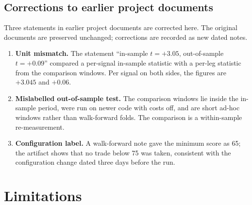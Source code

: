 \documentclass[11pt,a4paper]{article}
\begin{document}
\subsection{Corrections to earlier project documents}
\label{sec:corrections}
Three statements in earlier project documents are corrected here. The original documents are
preserved unchanged; corrections are recorded as new dated notes.
\begin{enumerate}
\item \textbf{Unit mismatch.} The statement ``in-sample $t=+3.05$, out-of-sample $t=+0.09$''
compared a per-signal in-sample statistic with a per-leg statistic from the comparison windows.
Per signal on both sides, the figures are $+3.045$ and $+0.06$. %
\item \textbf{Mislabelled out-of-sample test.} The comparison windows lie inside the in-sample
period, were run on newer code with costs off, and are short ad-hoc windows rather than
walk-forward folds. The comparison is a within-sample re-measurement. %
\item \textbf{Configuration label.} A walk-forward note gave the minimum score as 65; the
artifact shows that no trade below 75 was taken, consistent with the configuration change dated
three days before the run. %
\end{enumerate}

\section{Limitations}
\label{sec:limits}
\end{document}
